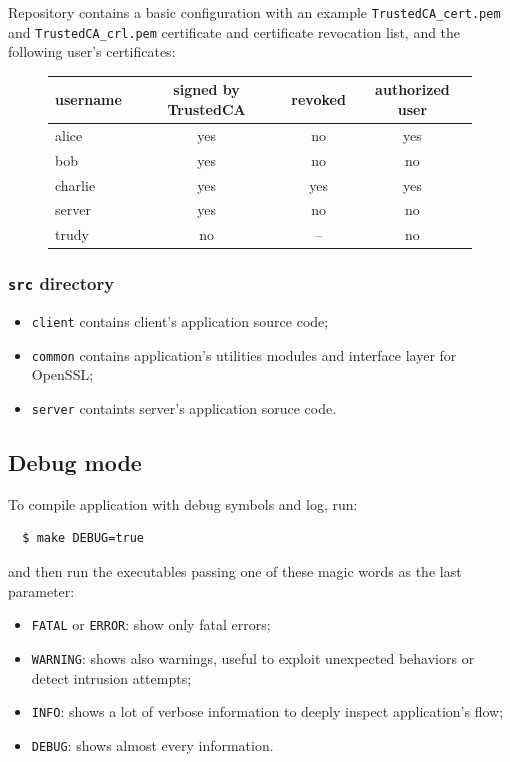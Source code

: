 \documentclass[a4paper,12pt]{article}
\begin{document}
Repository contains a basic configuration with an example \texttt{TrustedCA\_cert.pem} and \texttt{TrustedCA\_crl.pem} certificate and certificate revocation list, and the following user's certificates:
\begin{figure}[H]
\centering
\begin{tabular}{| l | c | c | c |}\hline
username  & signed by TrustedCA & revoked & authorized user \\ \hline
alice     & yes                 & no      & yes             \\ \hline
bob       & yes                 & no      & no              \\ \hline
charlie   & yes                 & yes     & yes             \\ \hline
server    & yes                 & no      & no              \\ \hline
trudy     & no                  & --      & no              \\ \hline
\end{tabular}
\end{figure}

\subsubsection{\texttt{src} directory}
\begin{itemize}
  \item \texttt{client} contains client's application source code;
  \item \texttt{common} contains application's utilities modules and interface layer for OpenSSL;
  \item \texttt{server} containts server's application soruce code.
\end{itemize}

\subsection{Debug mode}
To compile application with debug symbols and log, run:

\begin{verbatim}
  $ make DEBUG=true
\end{verbatim}

and then run the executables passing one of these magic words as the last parameter:

\begin{itemize}
  \item \texttt{FATAL} or \texttt{ERROR}: show only fatal errors;
  \item \texttt{WARNING}: shows also warnings, useful to exploit unexpected behaviors or detect intrusion attempts;
  \item \texttt{INFO}: shows a lot of verbose information to deeply inspect application's flow;
  \item \texttt{DEBUG}: shows almost every information.
\end{itemize}
\end{document}
